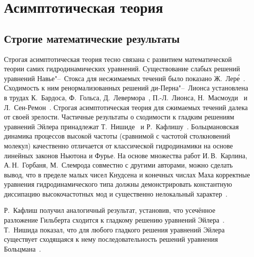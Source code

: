 \section{Асимптотическая теория} \label{sect:asymptotic}

\subsection{Строгие математические результаты}

Строгая асимптотическая теория тесно связана с развитием математической теории самих гидродинамических уравнений.
Существование слабых решений уравнений Навье"--~Стокса для несжимаемых течений было показано Ж.~Лер\'{е}~\cite{Leray1934}.
Сходимость к ним ренормализованных решений ди-Перна"--~Лионса установлена в трудах
К.~Бардоса, Ф.~Гольса, Д.~Левермора~\autocite{Bardos1993},
П.-Л.~Лионса, Н.~Масмоуди~\autocite{Masmoudi2001} и Л.~Сен-Ремон~\autocite{Golse2004}.
Строгая асимптотическая теория для сжимаемых течений далека от своей зрелости.
Частичные результаты о сходимости к гладким решениям уравнений Эйлера принадлежат
Т.~Нишиде~\autocite{Nishida1978} и Р.~Кафлишу~\autocite{Caflisch1980limit}.
Больцмановская динамика процессов высокой частоты (сравнимой с частотой столкновений молекул)
качественно отличается от классической гидродинамики на основе линейных законов Ньютона и Фурье.
На основе множества работ И.\,В.~Карлина, А.\,Н.~Горбаня, М.~Слемрода совместно с другими авторами,
можно сделать вывод, что в пределе малых чисел Кнудсена и конечных числах Маха корректные уравнения
гидродинамического типа должны демонстрировать константную диссипацию высокочастотных мод
и существенно нелокальный характер~\autocite{Gorban2014}.



Р.~Кафлиш получил аналогичный результат, установив, что усечённое разложение Гильберта
сходится к гладкому решению уравнений Эйлера~\cite{Caflisch1980limit}.
Т.~Нишида показал, что для любого гладкого решения уравнений Эйлера существует сходящаяся к нему
последовательность решений уравнения Больцмана~\cite{Nishida1978}.


